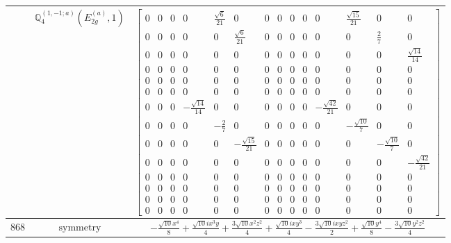 \documentclass[fleqn,8pt,landscape]{jsarticle}
\begin{document}
\begin{longtable}{ccc}
$  $ & $ \mathbb{Q}_{4}^{(1,-1;a)}(E_{2g}^{(a)},1) $ & $ \begin{bmatrix} 0 & 0 & 0 & 0 & \frac{\sqrt{6}}{21} & 0 & 0 & 0 & 0 & 0 & 0 & \frac{\sqrt{15}}{21} & 0 & 0 \\ 0 & 0 & 0 & 0 & 0 & \frac{\sqrt{6}}{21} & 0 & 0 & 0 & 0 & 0 & 0 & \frac{2}{7} & 0 \\ 0 & 0 & 0 & 0 & 0 & 0 & 0 & 0 & 0 & 0 & 0 & 0 & 0 & \frac{\sqrt{14}}{14} \\ 0 & 0 & 0 & 0 & 0 & 0 & 0 & 0 & 0 & 0 & 0 & 0 & 0 & 0 \\ 0 & 0 & 0 & 0 & 0 & 0 & 0 & 0 & 0 & 0 & 0 & 0 & 0 & 0 \\ 0 & 0 & 0 & 0 & 0 & 0 & 0 & 0 & 0 & 0 & 0 & 0 & 0 & 0 \\ 0 & 0 & 0 & - \frac{\sqrt{14}}{14} & 0 & 0 & 0 & 0 & 0 & 0 & - \frac{\sqrt{42}}{21} & 0 & 0 & 0 \\ 0 & 0 & 0 & 0 & - \frac{2}{7} & 0 & 0 & 0 & 0 & 0 & 0 & - \frac{\sqrt{10}}{7} & 0 & 0 \\ 0 & 0 & 0 & 0 & 0 & - \frac{\sqrt{15}}{21} & 0 & 0 & 0 & 0 & 0 & 0 & - \frac{\sqrt{10}}{7} & 0 \\ 0 & 0 & 0 & 0 & 0 & 0 & 0 & 0 & 0 & 0 & 0 & 0 & 0 & - \frac{\sqrt{42}}{21} \\ 0 & 0 & 0 & 0 & 0 & 0 & 0 & 0 & 0 & 0 & 0 & 0 & 0 & 0 \\ 0 & 0 & 0 & 0 & 0 & 0 & 0 & 0 & 0 & 0 & 0 & 0 & 0 & 0 \\ 0 & 0 & 0 & 0 & 0 & 0 & 0 & 0 & 0 & 0 & 0 & 0 & 0 & 0 \\ 0 & 0 & 0 & 0 & 0 & 0 & 0 & 0 & 0 & 0 & 0 & 0 & 0 & 0 \end{bmatrix} $ \\ \hline
$ 868 $ & $ \text{symmetry} $ & $ - \frac{\sqrt{10} x^{4}}{8} + \frac{\sqrt{10} i x^{3} y}{4} + \frac{3 \sqrt{10} x^{2} z^{2}}{4} + \frac{\sqrt{10} i x y^{3}}{4} - \frac{3 \sqrt{10} i x y z^{2}}{2} + \frac{\sqrt{10} y^{4}}{8} - \frac{3 \sqrt{10} y^{2} z^{2}}{4} $ \\

\end{longtable}
\end{document}
